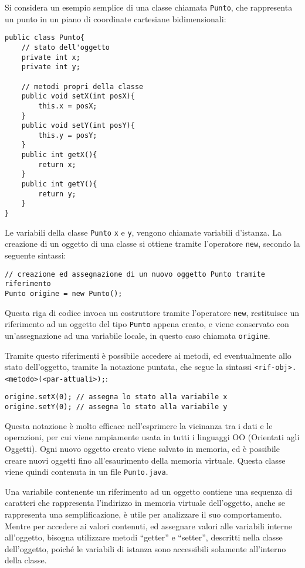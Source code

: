 \documentclass{article}
\numberwithin{equation}{subsection}
\begin{document}
Si considera un esempio semplice di una classe chiamata \verb|Punto|, che rappresenta un punto in un piano di coordinate cartesiane bidimensionali:
\begin{verbatim}
public class Punto{
    // stato dell'oggetto
    private int x;
    private int y;

    // metodi propri della classe
    public void setX(int posX){
        this.x = posX;
    }
    public void setY(int posY){
        this.y = posY;
    }
    public int getX(){
        return x;
    }
    public int getY(){
        return y;
    }
}
\end{verbatim}
Le variabili della classe \verb|Punto| \verb|x| e \verb|y|, vengono chiamate variabili d'istanza. La creazione di un oggetto di una classe si ottiene tramite l'operatore \verb|new|, 
secondo la seguente sintassi:
\begin{verbatim}
// creazione ed assegnazione di un nuovo oggetto Punto tramite riferimento
Punto origine = new Punto();
\end{verbatim}
Questa riga di codice invoca un costruttore tramite l'operatore \verb|new|, restituisce un riferimento ad un oggetto del tipo \verb|Punto| appena creato, e viene conservato 
con un'assegnazione ad una variabile locale, in questo caso chiamata \verb|origine|. 

Tramite questo riferimenti è possibile accedere ai metodi, ed eventualmente allo stato dell'oggetto, tramite la notazione puntata, che segue la sintassi 
\verb|<rif-obj>.<metodo>(<par-attuali>);|:  
\begin{verbatim}
origine.setX(0); // assegna lo stato alla variabile x
origine.setY(0); // assegna lo stato alla variabile y
\end{verbatim}
Questa notazione è molto efficace nell'esprimere la vicinanza tra i dati e le operazioni, per cui viene ampiamente usata in tutti i linguaggi OO (Orientati agli Oggetti). 
Ogni nuovo oggetto creato viene salvato in memoria, ed è possibile creare nuovi oggetti fino all'esaurimento della memoria virtuale. 
Questa classe viene quindi contenuta in un file \verb|Punto.java|. 



Una variabile contenente un riferimento ad un oggetto contiene una sequenza di caratteri che rappresenta l'indirizzo in memoria virtuale dell'oggetto, anche se rappresenta una 
semplificazione, è utile per analizzare il suo comportamento. Mentre per accedere ai valori contenuti, ed assegnare valori alle variabili interne all'oggetto, bisogna utilizzare 
metodi ``getter'' e ``setter'', descritti nella classe dell'oggetto, poiché le variabili di istanza sono accessibili solamente all'interno della classe. 
\end{document}
